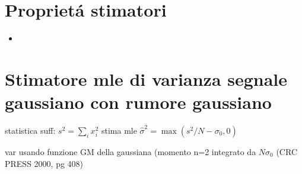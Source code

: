 \section{Propriet\'a stimatori}

\begin{itemize}
\item 
\end{itemize}

\section{Stimatore mle di varianza segnale gaussiano con rumore gaussiano}

statistica suff: $s^2=\sum_ix_i^2$
stima mle $\hat{\sigma}^2=\max{(s^2/N-\sigma_0,0)}$

var usando funzione GM della gaussiana
(momento n=2 integrato da $N\sigma_0$
(CRC PRESS 2000, pg 408)
